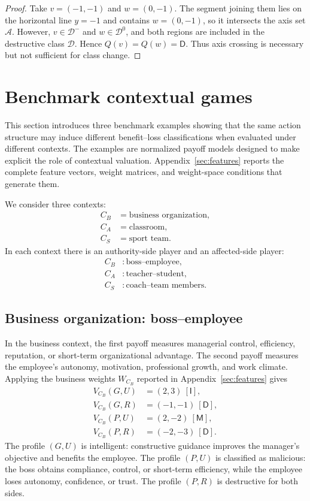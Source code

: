 \documentclass[a4paper,fleqn]{cas-dc}
\theoremstyle{remark}
\newcommand{\Iclass}{\mathsf{I}}
\newcommand{\Mclass}{\mathsf{M}}
\newcommand{\Dclass}{\mathsf{D}}
\begin{document}
\begin{proof}
Take $v=(-1,-1)$ and $w=(0,-1)$. The segment joining them lies on the horizontal line $y=-1$ and contains $w=(0,-1)$, so it intersects the axis set $\mathcal A$. However, $v\in\mathcal D^-$ and $w\in\mathcal D^0$, and both regions are included in the destructive class $\mathcal D$. Hence $Q(v)=Q(w)=\Dclass$. Thus axis crossing is necessary but not sufficient for class change.
\end{proof}

\section{Benchmark contextual games}
\label{sec:benchmarks}

This section introduces three benchmark examples showing that the same action structure may induce different benefit--loss classifications when evaluated under different contexts. The examples are normalized payoff models designed to make explicit the role of contextual valuation. Appendix~\ref{sec:features} reports the complete feature vectors, weight matrices, and weight-space conditions that generate them.

We consider three contexts:
\[
\begin{aligned}
C_B&=\text{business organization},\\
C_A&=\text{classroom},\\
C_S&=\text{sport team}.
\end{aligned}
\]
In each context there is an authority-side player and an affected-side player:
\[
\begin{aligned}
C_B&:\text{boss--employee},\\
C_A&:\text{teacher--student},\\
C_S&:\text{coach--team members}.
\end{aligned}
\]

\subsection{Business organization: boss--employee}

In the business context, the first payoff measures managerial control, efficiency, reputation, or short-term organizational advantage. The second payoff measures the employee's autonomy, motivation, professional growth, and work climate. Applying the business weights $W_{C_B}$ reported in Appendix~\ref{sec:features} gives
\[
\begin{aligned}
V_{C_B}(G,U)&=(2,3)\ [\Iclass],\\
V_{C_B}(G,R)&=(-1,-1)\ [\Dclass],\\
V_{C_B}(P,U)&=(2,-2)\ [\Mclass],\\
V_{C_B}(P,R)&=(-2,-3)\ [\Dclass].
\end{aligned}
\]
The profile $(G,U)$ is intelligent: constructive guidance improves the manager's objective and benefits the employee. The profile $(P,U)$ is classified as malicious: the boss obtains compliance, control, or short-term efficiency, while the employee loses autonomy, confidence, or trust. The profile $(P,R)$ is destructive for both sides.
\end{document}
